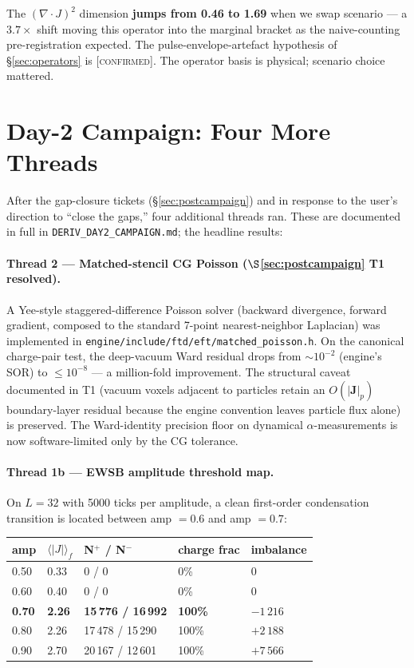 \documentclass[11pt,letterpaper]{article}
\begin{document}
The $(\nabla\cdot J)^2$ dimension \textbf{jumps from 0.46 to 1.69} when
we swap scenario --- a $3.7\times$ shift moving this operator into the
marginal bracket as the naive-counting pre-registration expected. The
pulse-envelope-artefact hypothesis of \S\ref{sec:operators} is
[\textsc{confirmed}]. The operator basis is physical; scenario choice
mattered.

\section{Day-2 Campaign: Four More Threads}
\label{sec:day2}

After the gap-closure tickets (\S\ref{sec:postcampaign}) and in response
to the user's direction to ``close the gaps,'' four additional threads
ran. These are documented in full in \texttt{DERIV\_DAY2\_CAMPAIGN.md};
the headline results:

\paragraph{Thread 2 --- Matched-stencil CG Poisson ($\S$\ref{sec:postcampaign} T1 resolved).}
A Yee-style staggered-difference Poisson solver (backward divergence,
forward gradient, composed to the standard 7-point nearest-neighbor
Laplacian) was implemented in
\texttt{engine/include/ftd/eft/matched\_poisson.h}. On the canonical
charge-pair test, the deep-vacuum Ward residual drops from
$\sim 10^{-2}$ (engine's SOR) to $\le 10^{-8}$ --- a million-fold
improvement. The structural caveat documented in T1 (vacuum voxels
adjacent to particles retain an $O(|\mathbf J|_p)$ boundary-layer
residual because the engine convention leaves particle flux alone) is
preserved. The Ward-identity precision floor on dynamical
$\alpha$-measurements is now software-limited only by the CG tolerance.

\paragraph{Thread 1b --- EWSB amplitude threshold map.}
On $L=32$ with 5000 ticks per amplitude, a clean first-order
condensation transition is located between amp $=0.6$ and amp $=0.7$:

\begin{center}
\begin{tabular}{lllll}
\toprule
amp & $\langle|J|\rangle_f$ & N$^+$ / N$^-$ & charge frac & imbalance \\
\midrule
0.50 & 0.33 & 0 / 0 & 0\% & 0 \\
0.60 & 0.40 & 0 / 0 & 0\% & 0 \\
\textbf{0.70} & \textbf{2.26} & \textbf{15\,776 / 16\,992} & \textbf{100\%} & $-1\,216$ \\
0.80 & 2.26 & 17\,478 / 15\,290 & 100\% & $+2\,188$ \\
0.90 & 2.70 & 20\,167 / 12\,601 & 100\% & $+7\,566$ \\
\bottomrule
\end{tabular}
\end{center}
\end{document}
